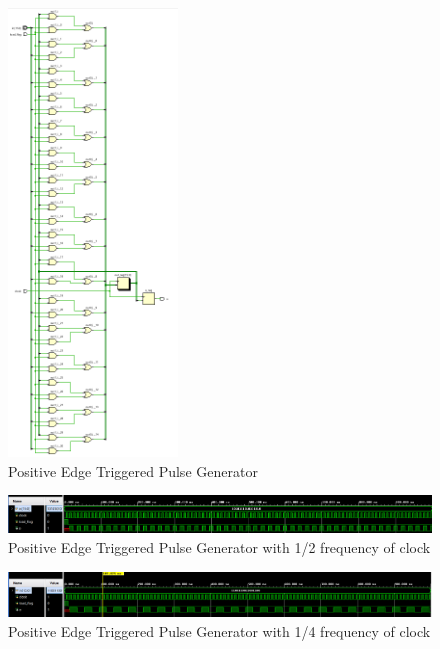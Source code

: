\documentclass[pdftex,12pt,a4paper]{article}
\begin{document}
\begin{figure}[H]
    	\centering
    	\includegraphics[width=0.4\textwidth]{schematic/pulse.png}	
    	\caption{Positive Edge Triggered Pulse Generator}
    	\label{D-flip-flop schematic}
    \end{figure}
    
    \begin{figure}[H]
    	\centering
    	\includegraphics[width=1\textwidth]{simulations/pulse_1_2_freq.png}	
    	\caption{Positive Edge Triggered Pulse Generator with 1/2 frequency of clock}
    	\label{Positive Edge Triggered Pulse Generator}
    \end{figure}


    \begin{figure}[H]
    	\centering
    	\includegraphics[width=1\textwidth]{simulations/pulse_1_4_freq.png}	
    	\caption{Positive Edge Triggered Pulse Generator with 1/4 frequency of clock}
    	\label{Positive Edge Triggered Pulse Generator}
    \end{figure}
\end{document}
